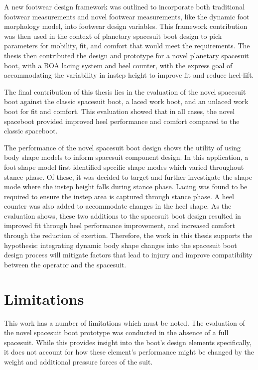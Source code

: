 \documentclass[defaultstyle,11pt]{thesis}
\begin{document}
A new footwear design framework was outlined to incorporate both traditional footwear measurements and novel footwear measurements, like the dynamic foot morphology model, into footwear design variables.
This framework contribution was then used in the context of planetary spacesuit boot design to pick parameters for mobility, fit, and comfort that would meet the requirements.
The thesis then contributed the design and prototype for a novel planetary spacesuit boot, with a BOA lacing system and heel counter, with the express goal of accommodating the variability in instep height to improve fit and reduce heel-lift.

The final contribution of this thesis lies in the evaluation of the novel spacesuit boot against the classic spacesuit boot, a laced work boot, and an unlaced work boot for fit and comfort.
This evaluation showed that in all cases, the novel spaceboot provided improved heel performance and comfort compared to the classic spaceboot.

The performance of the novel spacesuit boot design shows the utility of using body shape models to inform spacesuit component design.
In this application, a foot shape model first identified specific shape modes which varied throughout stance phase.
Of these, it was decided to target and further investigate the shape mode where the instep height falls during stance phase.
Lacing was found to be required to ensure the instep area is captured through stance phase.
A heel counter was also added to accommodate changes in the heel shape.
As the evaluation shows, these two additions to the spacesuit boot design resulted in improved fit through heel performance improvement, and increased comfort through the reduction of exertion.
Therefore, the work in this thesis supports the hypothesis: integrating dynamic body shape changes into the spacesuit boot design process will mitigate factors that lead to injury and improve compatibility between the operator and the spacesuit.

\hypertarget{limitations}{%
\section{Limitations}\label{limitations}}

This work has a number of limitations which must be noted.
The evaluation of the novel spacesuit boot prototype was conducted in the absence of a full spacesuit.
While this provides insight into the boot's design elements specifically, it does not account for how these element's performance might be changed by the weight and additional pressure forces of the suit.
\end{document}
